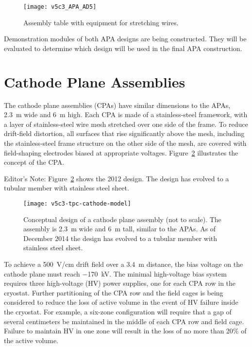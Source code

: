  
\begin{figure}[htpb]
\centering
\texttt{[image: v5c3\_APA\_AD5]}
\caption{Assembly table with equipment for stretching wires.}
\label{fig:tpc-APA-AD5}
\end{figure}
                          
Demonstration modules of both APA designs are being constructed. They will be evaluated to determine which design will be used in the final APA construction.

\section{Cathode Plane Assemblies}
\label{subsec:v5-tpc-chamber-cathode}

The cathode plane assemblies (CPAs) have similar dimensions to the APAs, 
2.3~m wide and 6~m high. Each CPA is made of a stainless-steel framework, 
with a layer of stainless-steel wire mesh stretched over one side 
of the frame. To reduce drift-field distortion, all surfaces that rise
significantly above the mesh, including the stainless-steel 
frame structure on the other side of the mesh, are covered with 
field-shaping electrodes biased at appropriate voltages. 
Figure~\ref{fig:tpc-cathode-model} illustrates the concept of the 
CPA. 

\begin{editornote}
  Editor's Note: Figure~\ref{fig:tpc-cathode-model} shows the 2012 design. The design has evolved to a tubular member with stainless steel sheet.
\end{editornote}


\begin{figure}[htbp]
\centering
\texttt{[image: v5c3-tpc-cathode-model]}
\caption[Conceptual design of a cathode plane assembly]{Conceptual design of a cathode plane assembly (not to scale). 
The assembly is 2.3~m wide and 6~m tall, similar to the APAs. As of December 2014 the design has evolved to a tubular member with stainless steel sheet. }
\label{fig:tpc-cathode-model}
\end{figure}

To achieve a 500~V/cm drift field over a 3.4~m distance, the bias 
voltage on the cathode plane must reach $-$170~kV. The minimal high-voltage 
bias system requires three high-voltage (HV) power supplies, one for each CPA 
row in the cryostat. Further partitioning of the CPA row and the field cages is being considered to reduce the loss of active volume in the event of HV failure inside the cryostat. For example, a six-zone configuration will require that a gap of several centimeters be maintained in the middle of each CPA row and field cage.  Failure to maintain HV in one zone will result in the loss of no more than 20\% of the active volume. 
